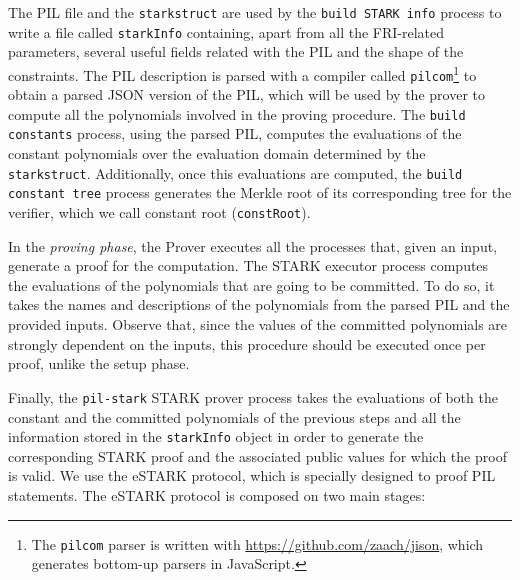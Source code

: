 The PIL file and the \texttt{starkstruct} are used by the \texttt{build STARK info} process to write a file called \texttt{starkInfo} containing, apart from all the FRI-related parameters, several useful fields related with the PIL and the shape of the constraints. The PIL description is parsed with a compiler called \texttt{pilcom}\footnote{The \texttt{pilcom} parser is written with \url{https://github.com/zaach/jison}, which generates bottom-up parsers in JavaScript.} to obtain a parsed JSON version of the PIL, which will be used by the prover to compute all the polynomials involved in the proving procedure. The \texttt{build constants} process, using the parsed PIL, computes the evaluations of the constant polynomials over the evaluation domain determined by the \texttt{starkstruct}. Additionally, once this evaluations are computed, the \texttt{build constant tree} process generates the Merkle root of its corresponding tree for the verifier, which we call constant root (\texttt{constRoot}). 

In the \textit{proving phase}, the Prover executes all the processes that, given an input, generate a proof for the computation. 
The STARK executor process computes the evaluations of the polynomials that are going to be committed. To do so, it takes the names and descriptions of the polynomials from the parsed PIL and the provided inputs. Observe that, since the values of the committed polynomials are strongly dependent on the inputs, this procedure should be executed once per proof, unlike the setup phase. 

Finally, the \texttt{pil-stark} STARK prover process takes the evaluations of both the constant and the committed polynomials of the previous steps and all the information stored in the \texttt{starkInfo} object in order to generate the corresponding STARK proof and the associated public values for which the proof is valid. 
We use the \textsf{eSTARK} protocol, which is specially designed to proof PIL statements. 
The \textsf{eSTARK} protocol is composed on two main stages:

